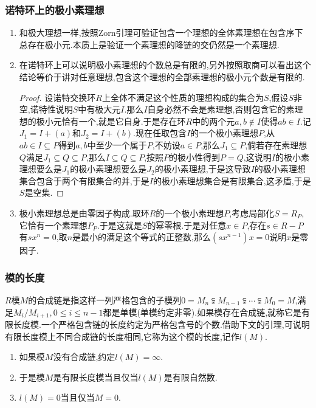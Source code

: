 \subsubsection{诺特环上的极小素理想}
\begin{enumerate}
	\item 和极大理想一样,按照Zorn引理可验证包含一个理想的全体素理想在包含序下总存在极小元.本质上是验证一个素理想的降链的交仍然是一个素理想.
	\item 在诺特环上可以说明极小素理想的个数总是有限的,另外按照取商可以看出这个结论等价于讲对任意理想,包含这个理想的全部素理想的极小元个数是有限的.
	\begin{proof}
		
		设诺特交换环$R$上全体不满足这个性质的理想构成的集合为$S$,假设$S$非空,诺特性说明$S$中有极大元$I$.那么$I$自身必然不会是素理想,否则包含它的素理想的极小元恰有一个,就是它自身.于是存在环$R$中的两个元$a,b\not\in I$使得$ab\in I$.记$J_1=I+(a)$和$J_2=I+(b)$.现在任取包含$I$的一个极小素理想$P$,从$ab\in I\subseteq P$得到$a,b$中至少一个属于$P$,不妨设$a\in P$,那么$J_1\subseteq P$,倘若存在素理想$Q$满足$J_1\subseteq Q\subseteq P$,那么$I\subseteq Q\subseteq P$,按照$P$的极小性得到$P=Q$,这说明$I$的极小素理想要么是$J_1$的极小素理想要么是$J_2$的极小素理想,于是这导致$I$的极小素理想集合包含于两个有限集合的并,于是$I$的极小素理想集合是有限集合,这矛盾,于是$S$是空集.
	\end{proof}
    \item 极小素理想总是由零因子构成.取环$R$的一个极小素理想$P$,考虑局部化$S=R_P$,它恰有一个素理想$P_P$.于是这就是$S$的幂零根.于是对任意$x\in P$,存在$s\in R-P$有$sx^n=0$,取$n$是最小的满足这个等式的正整数,那么$(sx^{n-1})x=0$说明$x$是零因子.
\end{enumerate}
\subsubsection{模的长度}

$R$模$M$的合成链是指这样一列严格包含的子模列$0=M_n\subsetneqq M_{n-1}\subsetneqq\cdots\subsetneqq M_0=M$,满足$M_i/M_{i+1},0\le i\le n-1$都是单模(单模约定非零).如果模存在合成链,就称它是有限长度模.一个严格包含链的长度约定为严格包含号的个数.借助下文的引理,可说明有限长度模上不同合成链的长度相同,它称为这个模的长度,记作$l(M)$.
\begin{enumerate}
	\item 如果模$M$没有合成链,约定$l(M)=\infty$.
	\item 于是模$M$是有限长度模当且仅当$l(M)$是有限自然数.
	\item $l(M)=0$当且仅当$M=0$.
\end{enumerate}
	
